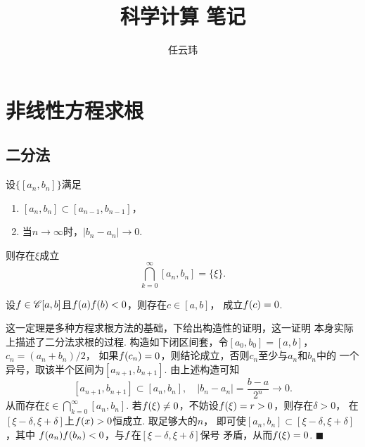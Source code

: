 

\title{科学计算 笔记}
\author{任云玮}
\date{}


\maketitle
\tableofcontents
\newpage


\newpage


\newpage


\newpage


\newpage


\newpage
\section{非线性方程求根}
\subsection{二分法}
  \begin{thm}[闭区间套定理]
    设$\{[a_n, b_n]\}$满足
    \begin{enumerate}
      \item $[a_n, b_n] \subset [a_{n-1}, b_{n-1}]$，
      \item 当$n\to\infty$时，$|b_n - a_n|\to 0$.
    \end{enumerate}
    则存在$\xi$成立
    \[
      \bigcap_{k=0}^{\infty}[a_n, b_n] = \{\xi\}.
    \]
  \end{thm}

  \begin{thm}[连续函数零点定理]
    \label{thm: 连续函数零点定理}
    设$\mathnormal{f}\in\mathscr{C}[a, b]$且$\mathnormal{f}(a)\mathnormal{f}(b)<0$，则存在$c\in[a, b]$，
    成立$\mathnormal{f}(c) = 0$.
  \end{thm}
  \remark
    这一定理是多种方程求根方法的基础，下给出构造性的证明，这一证明
    本身实际上描述了二分法求根的过程.
  \proof
    构造如下闭区间套，令$[a_0, b_0]=[a, b]$，$c_n=(a_n+b_n)/2$，
    如果$\mathnormal{f}(c_n)=0$，则结论成立，否则$c_n$至少与$a_n$和$b_n$中的
    一个异号，取该半个区间为$[a_{n+1}, b_{n+1}]$. 由上述构造可知
    \[
      [a_{n+1}, b_{n+1}]\subset[a_n,b_n],\quad
      |b_n - a_n| = \frac{b-a}{2^n}\to 0.
    \]
    从而存在$\xi\in\bigcap_{k=0}^\infty[a_n, b_n]$.
    若$\mathnormal{f}(\xi)\ne 0$，不妨设$\mathnormal{f}(\xi) = r>0$，则存在$\delta>0$，
    在$[\xi-\delta,\xi+\delta]$上$\mathnormal{f}(x)>0$恒成立. 取足够大的$n$，
    即可使$[a_n,b_n]\subset[\xi-\delta,\xi+\delta]$，其中
    $\mathnormal{f}(a_n)\mathnormal{f}(b_n)<0$，与$\mathnormal{f}$在$[\xi-\delta,\xi+\delta]$保号
    矛盾，从而$\mathnormal{f}(\xi)=0$. $\blacksquare$

